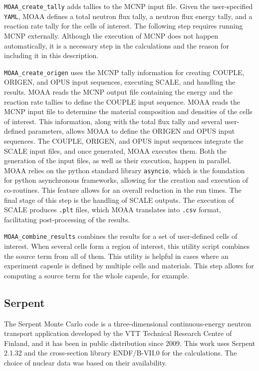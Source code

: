 \texttt{MOAA\_create\_tally} adds tallies to the MCNP input file.
Given the user-specified \texttt{YAML}, MOAA defines a total neutron flux tally, a neutron flux energy tally, and a reaction rate tally for the cells of interest.
The following step requires running MCNP externally.
Although the execution of MCNP does not happen automatically, it is a necessary step in the calculations and the reason for including it in this description.

\texttt{MOAA\_create\_origen} uses the MCNP tally information for creating COUPLE, ORIGEN, and OPUS input sequences, executing SCALE, and handling the results.
MOAA reads the MCNP output file containing the energy and the reaction rate tallies to define the COUPLE input sequence.
MOAA reads the MCNP input file to determine the material composition and densities of the cells of interest.
This information, along with the total flux tally and several user-defined parameters, allows MOAA to define the ORIGEN and OPUS input sequences.
The COUPLE, ORIGEN, and OPUS input sequences integrate the SCALE input files, and once generated, MOAA executes them.
Both the generation of the input files, as well as their execution, happen in parallel.
MOAA relies on the python standard library \texttt{asyncio}, which is the foundation for python asynchronous frameworks, allowing for the creation and execution of co-routines.
This feature allows for an overall reduction in the run times.
The final stage of this step is the handling of SCALE outputs.
The execution of SCALE produces \texttt{.plt} files, which MOAA translates into \texttt{.csv} format, facilitating post-processing of the results.

\texttt{MOAA\_combine\_results} combines the results for a set of user-defined cells of interest.
When several cells form a region of interest, this utility script combines the source term from all of them.
This utility is helpful in cases where an experiment capsule is defined by multiple cells and materials.
This step allows for computing a source term for the whole capsule, for example.


\subsection{Serpent}

The Serpent Monte Carlo code \cite{leppanen_serpent_2015} is a three-dimensional continuous-energy neutron transport application developed by the VTT Technical Research Centre of Finland, and it has been in public distribution since 2009.
This work uses Serpent 2.1.32 and the cross-section library ENDF/B-VII.0 for the calculations.
The choice of nuclear data was based on their availability.

